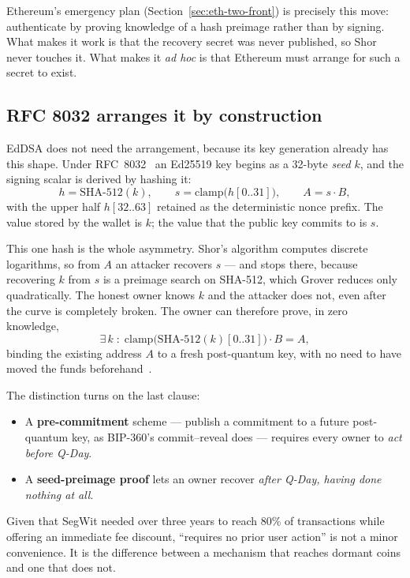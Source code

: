 Ethereum's emergency plan (Section~\ref{sec:eth-two-front}) is precisely this
move: authenticate by proving knowledge of a hash preimage rather than by signing.
What makes it work is that the recovery secret was never published, so Shor never
touches it. What makes it \emph{ad hoc} is that Ethereum must arrange for such a
secret to exist.

\subsection{RFC 8032 arranges it by construction}
EdDSA does not need the arrangement, because its key generation already has this
shape. Under RFC~8032~\cite{rfc8032} an Ed25519 key begins as a 32-byte
\emph{seed} $k$, and the signing scalar is derived by hashing it:
\[
  h = \mathrm{SHA\text{-}512}(k), \qquad
  s = \mathrm{clamp}\big(h[0..31]\big), \qquad
  A = s\cdot B ,
\]
with the upper half $h[32..63]$ retained as the deterministic nonce prefix. The
value stored by the wallet is $k$; the value that the public key commits to is
$s$.

This one hash is the whole asymmetry. Shor's algorithm computes discrete
logarithms, so from $A$ an attacker recovers $s$ --- and stops there, because
recovering $k$ from $s$ is a preimage search on SHA-512, which Grover reduces
only quadratically. The honest owner knows $k$ and the attacker does not, even
after the curve is completely broken. The owner can therefore prove, in zero
knowledge,
\[
  \exists\, k \;:\; \mathrm{clamp}\big(\mathrm{SHA\text{-}512}(k)[0..31]\big)\cdot B = A ,
\]
binding the existing address $A$ to a fresh post-quantum key, with no need to
have moved the funds beforehand~\cite{eddsapq2025}.

The distinction turns on the last clause:

\begin{itemize}
  \item A \textbf{pre-commitment} scheme --- publish a commitment to a future
        post-quantum key, as BIP-360's commit--reveal does --- requires every
        owner to \emph{act before Q-Day}.
  \item A \textbf{seed-preimage proof} lets an owner recover \emph{after Q-Day,
        having done nothing at all}.
\end{itemize}

Given that SegWit needed over three years to reach 80\% of transactions while
offering an immediate fee discount, ``requires no prior user action'' is not a
minor convenience. It is the difference between a mechanism that reaches dormant
coins and one that does not.


